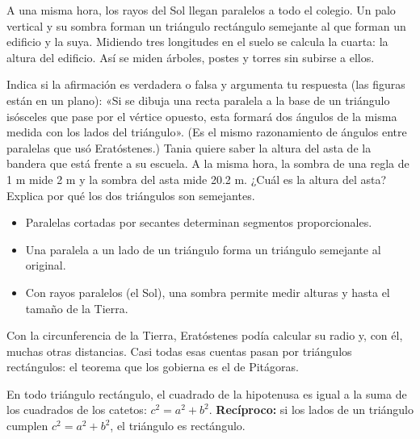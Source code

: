 \documentclass[11pt]{article}
\begin{document}
\begin{aplicacion}
A una misma hora, los rayos del Sol llegan paralelos a todo el colegio. Un palo
vertical y su sombra forman un triángulo rectángulo semejante al que forman un
edificio y la suya. Midiendo tres longitudes en el suelo se calcula la cuarta: la
altura del edificio. Así se miden árboles, postes y torres sin subirse a ellos.
\end{aplicacion}

\begin{preguntas}
\pregunta Indica si la afirmación es verdadera o falsa y argumenta tu respuesta (las
figuras están en un plano): «Si se dibuja una recta paralela a la base de un
triángulo isósceles que pase por el vértice opuesto, esta formará dos ángulos de la
misma medida con los lados del triángulo». (Es el mismo razonamiento de ángulos
entre paralelas que usó Eratóstenes.)
\pregunta Tania quiere saber la altura del asta de la bandera que está frente a su
escuela. A la misma hora, la sombra de una regla de 1 m mide 2 m y la sombra del
asta mide \num{20,2} m. ¿Cuál es la altura del asta? Explica por qué los dos
triángulos son semejantes.
\espacio{3cm}
\end{preguntas}

\begin{resumen}
\begin{itemize}
  \item Paralelas cortadas por secantes determinan segmentos proporcionales.
  \item Una paralela a un lado de un triángulo forma un triángulo semejante al original.
  \item Con rayos paralelos (el Sol), una sombra permite medir alturas y hasta el tamaño de la Tierra.
\end{itemize}
\end{resumen}

\label{tema:pitagoras}

\begin{hilo}
Con la circunferencia de la Tierra, Eratóstenes podía calcular su radio y, con él,
muchas otras distancias. Casi todas esas cuentas pasan por triángulos rectángulos:
el teorema que los gobierna es el de Pitágoras.
\end{hilo}

\begin{teorema}
En todo triángulo rectángulo, el cuadrado de la hipotenusa es igual a la suma de
los cuadrados de los catetos: $c^2 = a^2 + b^2$. \textbf{Recíproco:} si los lados de
un triángulo cumplen $c^2 = a^2 + b^2$, el triángulo es rectángulo.
\end{teorema}
\end{document}
